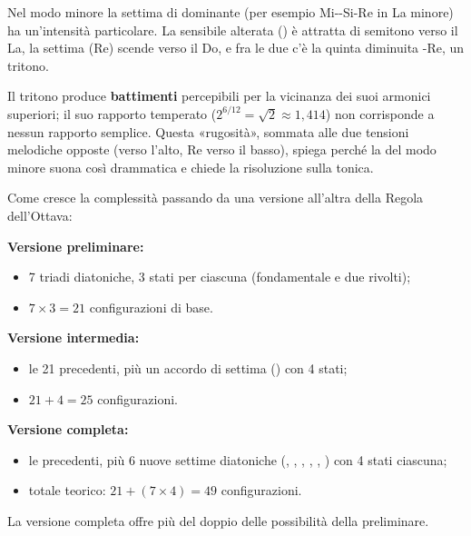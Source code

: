 \begin{fisica}
	\label{phys:doppia_tensione_v7}
	Nel modo minore la settima di dominante (per esempio Mi-\Soldiesis -Si-Re in La minore) ha un'intensità particolare. La sensibile alterata (\Soldiesis) è attratta di semitono verso il La, la settima (Re) scende verso il Do, e fra le due c'è la quinta diminuita \Soldiesis -Re, un tritono.

	Il tritono produce \textbf{battimenti} percepibili per la vicinanza dei suoi armonici superiori; il suo rapporto temperato ($2^{6/12} = \sqrt{2} \approx 1{,}414$) non corrisponde a nessun rapporto semplice. Questa «rugosità», sommata alle due tensioni melodiche opposte (\Soldiesis  verso l'alto, Re verso il basso), spiega perché la  del modo minore suona così drammatica e chiede la risoluzione sulla tonica.
\end{fisica}

\begin{matematica}
	\label{math:crescita_combinatoria}
	Come cresce la complessità passando da una versione all'altra della Regola dell'Ottava:

	\textbf{Versione preliminare:}
	\begin{itemize}
		\item 7 triadi diatoniche, 3 stati per ciascuna (fondamentale e due rivolti);
		\item $7 \times 3 = 21$ configurazioni di base.
	\end{itemize}

	\textbf{Versione intermedia:}
	\begin{itemize}
		\item le 21 precedenti, più un accordo di settima () con 4 stati;
		\item $21 + 4 = 25$ configurazioni.
	\end{itemize}

	\textbf{Versione completa:}
	\begin{itemize}
		\item le precedenti, più 6 nuove settime diatoniche (, , , , , ) con 4 stati ciascuna;
		\item totale teorico: $21 + (7 \times 4) = 49$ configurazioni.
	\end{itemize}

	La versione completa offre più del doppio delle possibilità della preliminare.
\end{matematica}

